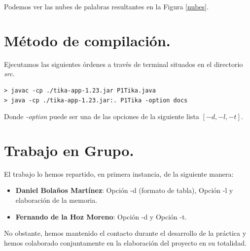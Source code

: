 \documentclass[12pt]{article}
\begin{document}
Podemos ver las nubes de palabras resultantes en la Figura \ref{nubes}.

\section{Método de compilación.}

Ejecutamos las siguientes órdenes a través de terminal situados en el directorio \textit{src}.

\begin{lstlisting}
> javac -cp ./tika-app-1.23.jar P1Tika.java
> java -cp ./tika-app-1.23.jar:. P1Tika -option docs
\end{lstlisting}

Donde \textit{-option} puede ser una de las opciones de la siguiente lista $[-d,-l,-t]$.

\section{Trabajo en Grupo.}

El trabajo lo hemos repartido, en primera instancia, de la siguiente manera:

\begin{itemize}
\item \textbf{Daniel Bolaños Martínez}: Opción -d (formato de tabla),  Opción -l y elaboración de la memoria.
\item \textbf{Fernando de la Hoz Moreno}: Opción -d y Opción -t.
\end{itemize}

No obstante, hemos mantenido el contacto durante el desarrollo de la práctica y hemos colaborado conjuntamente en la elaboración del proyecto en su totalidad.

\clearpage
\end{document}
